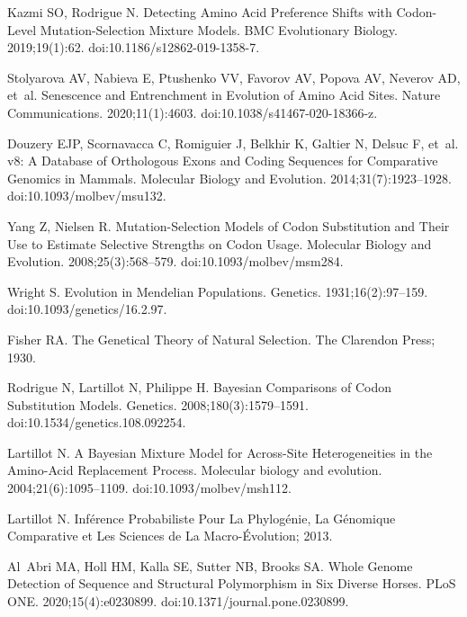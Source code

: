 \documentclass[10pt,letterpaper]{article}
\begin{document}
\begin{thebibliography}{10}
Kazmi SO, Rodrigue N.
\newblock Detecting Amino Acid Preference Shifts with Codon-Level
Mutation-Selection Mixture Models.
\newblock BMC Evolutionary Biology. 2019;19(1):62.
\newblock doi:{10.1186/s12862-019-1358-7}.

Stolyarova AV, Nabieva E, Ptushenko VV, Favorov AV, Popova AV, Neverov AD,
et~al.
\newblock Senescence and Entrenchment in Evolution of Amino Acid Sites.
\newblock Nature Communications. 2020;11(1):4603.
\newblock doi:{10.1038/s41467-020-18366-z}.

Douzery EJP, Scornavacca C, Romiguier J, Belkhir K, Galtier N, Delsuc F, et~al.
 v8: {{A}} Database of Orthologous Exons and Coding
Sequences for Comparative Genomics in Mammals.
\newblock Molecular Biology and Evolution. 2014;31(7):1923--1928.
\newblock doi:{10.1093/molbev/msu132}.

Yang Z, Nielsen R.
\newblock Mutation-Selection Models of Codon Substitution and Their Use to
Estimate Selective Strengths on Codon Usage.
\newblock Molecular Biology and Evolution. 2008;25(3):568--579.
\newblock doi:{10.1093/molbev/msm284}.

Wright S.
\newblock Evolution in {{Mendelian}} Populations.
\newblock Genetics. 1931;16(2):97--159.
\newblock doi:{10.1093/genetics/16.2.97}.

Fisher RA.
\newblock The {{Genetical Theory}} of {{Natural Selection}}.
\newblock The Clarendon Press; 1930.

Rodrigue N, Lartillot N, Philippe H.
\newblock Bayesian Comparisons of Codon Substitution Models.
\newblock Genetics. 2008;180(3):1579--1591.
\newblock doi:{10.1534/genetics.108.092254}.

Lartillot N.
\newblock A Bayesian Mixture Model for Across-Site Heterogeneities in the
Amino-Acid Replacement Process.
\newblock Molecular biology and evolution. 2004;21(6):1095--1109.
\newblock doi:{10.1093/molbev/msh112}.

Lartillot N.
\newblock Inf{\'e}rence Probabiliste Pour La Phylog{\'e}nie, La G{\'e}nomique
Comparative et Les Sciences de La Macro-{\'E}volution; 2013.

Al~Abri MA, Holl HM, Kalla SE, Sutter NB, Brooks SA.
\newblock Whole Genome Detection of Sequence and Structural Polymorphism in Six
Diverse Horses.
\newblock PLoS ONE. 2020;15(4):e0230899.
\newblock doi:{10.1371/journal.pone.0230899}.


\end{thebibliography}
\end{document}
